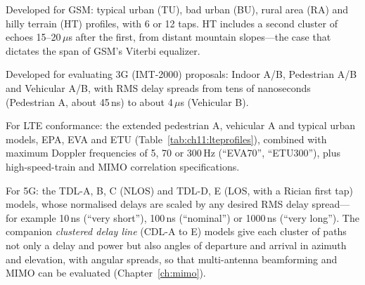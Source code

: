 \begin{description}[style=unboxed,leftmargin=0pt]
\item[COST 207 (1989).] Developed for GSM: typical urban (TU), bad urban (BU), rural area (RA)
and hilly terrain (HT) profiles, with 6 or 12 taps. HT includes a second cluster of echoes 15--20\,$\mu$s
after the first, from distant mountain slopes---the case that dictates the span of GSM's Viterbi
equalizer.
\item[ITU-R M.1225 (1997).] Developed for evaluating 3G (IMT-2000) proposals: Indoor A/B,
Pedestrian A/B and Vehicular A/B, with RMS delay spreads from tens of nanoseconds (Pedestrian A,
about 45\,ns) to about 4\,$\mu$s (Vehicular B).
\end{description}


\begin{description}[style=unboxed,leftmargin=0pt]
\item[3GPP TS 36.101 / 36.104 (2008).] For LTE conformance: the extended pedestrian A,
vehicular A and typical urban models, EPA, EVA and ETU (Table~\ref{tab:ch11:lteprofiles}),
combined with maximum Doppler frequencies of 5, 70 or 300\,Hz (``EVA70'', ``ETU300''), plus
high-speed-train and MIMO correlation specifications.
\item[3GPP TR 38.901 (2017 onwards).] For 5G: the TDL-A, B, C (NLOS) and TDL-D, E (LOS, with a
Rician first tap) models, whose normalised delays are scaled by any desired RMS delay spread---for
example 10\,ns (``very short''), 100\,ns (``nominal'') or 1000\,ns (``very long''). The companion
\emph{clustered delay line} (CDL-A to E) models give each cluster of paths not only a delay and
power but also angles of departure and arrival in azimuth and elevation, with angular spreads, so
that multi-antenna beamforming and MIMO can be evaluated (Chapter~\ref{ch:mimo}).
\end{description}






